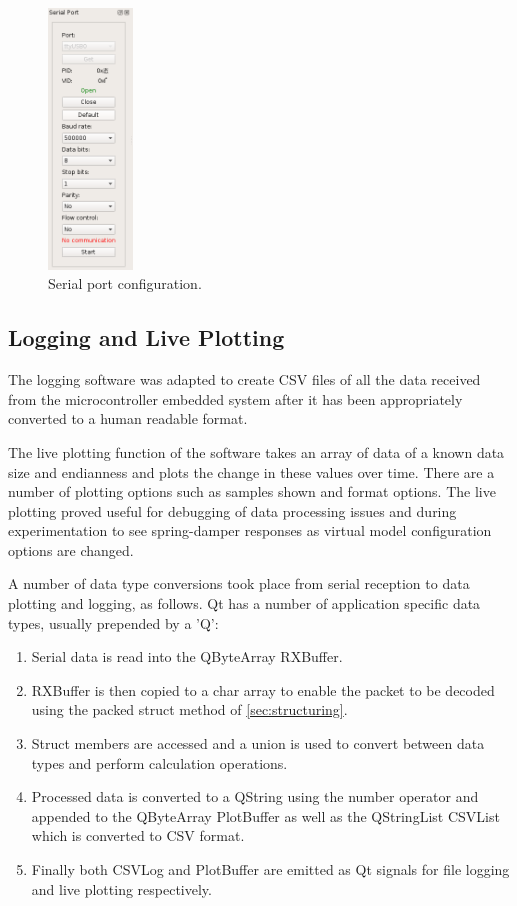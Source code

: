 \begin{figure}
\centering
\includegraphics[width=0.2\textwidth]{images/gui/serial-port}
\caption{Serial port configuration.}
\label{fig:serial-config}
\end{figure}

\subsection{Logging and Live Plotting}

The logging software was adapted to create CSV files of all the data received from the microcontroller embedded system after it has been appropriately converted to a human readable format.

The live plotting function of the software takes an array of data of a known data size and endianness and plots the change in these values over time. There are a number of plotting options such as samples shown and format options. The live plotting proved useful for debugging of data processing issues and during experimentation to see spring-damper responses as virtual model configuration options are changed.

A number of data type conversions took place from serial reception to data plotting and logging, as follows. Qt has a number of application specific data types, usually prepended by a 'Q':

\begin{enumerate}
\item Serial data is read into the QByteArray RXBuffer.
\item RXBuffer is then copied to a char\* array to enable the packet to be decoded using the packed struct method of \cref{sec:structuring}.
\item Struct members are accessed and a union is used to convert between data types and perform calculation operations.
\item Processed data is converted to a QString using the number operator and appended to the QByteArray PlotBuffer as well as the QStringList CSVList which is converted to CSV format.
\item Finally both CSVLog and PlotBuffer are emitted as Qt signals for file logging and live plotting respectively.
\end{enumerate}

